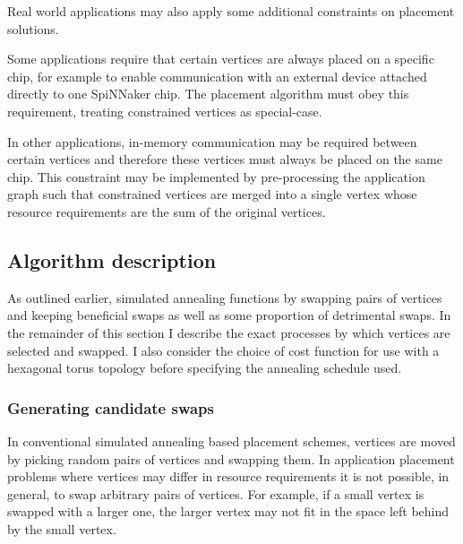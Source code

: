 				Real world applications may also apply some additional constraints on
				placement solutions.
				
				Some applications require that certain vertices are always placed on a
				specific chip, for example to enable communication with an external
				device attached directly to one SpiNNaker chip. The placement algorithm
				must obey this requirement, treating constrained vertices as
				special-case.
				
				In other applications, in-memory communication may be required between
				certain vertices and therefore these vertices must always be placed on
				the same chip. This constraint may be implemented by pre-processing the
				application graph such that constrained vertices are merged into a
				single vertex whose resource requirements are the sum of the original
				vertices.
		
		\subsection{Algorithm description}
			
			As outlined earlier, simulated annealing functions by swapping pairs of
			vertices and keeping beneficial swaps as well as some proportion of
			detrimental swaps. In the remainder of this section I describe the exact
			processes by which vertices are selected and swapped. I also consider the
			choice of cost function for use with a hexagonal torus topology before
			specifying the annealing schedule used.
		
			\subsubsection{Generating candidate swaps}
				
				In conventional simulated annealing based placement schemes, vertices
				are moved by picking random pairs of vertices and swapping them. In
				application placement problems where vertices may differ in resource
				requirements it is not possible, in general, to swap arbitrary pairs of
				vertices. For example, if a small vertex is swapped with a larger one,
				the larger vertex may not fit in the space left behind by the small
				vertex.
				
